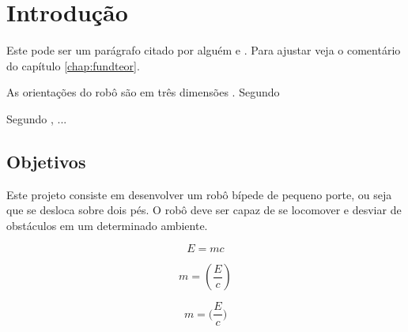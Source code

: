 \chapter{Introdução}
\label{chap:intro}

Este pode ser um parágrafo citado por alguém \cite{Barabasi2003-1} e \cite{barabasi2003linked}.
Para ajustar veja o comentário do capítulo \ref{chap:fundteor}.

As orientações do robô são em três dimensões \cite{aperea-1}.
Segundo 

Segundo , ...

\section{Objetivos}
\label{sec:obj}
Este projeto consiste em desenvolver um robô bípede de pequeno porte, ou seja que se desloca sobre dois pés. O robô deve ser capaz de se locomover e desviar de obstáculos em um determinado ambiente. 
\label{sec:obj}




\begin{equation}
\label{eq:energia}
  E=mc
\end{equation}


\begin{equation*}
  m=(\frac{E}{c})
\end{equation*}


\begin{equation*}
  m=\Bigg(\frac{E}{c}\Bigg)
\end{equation*}


